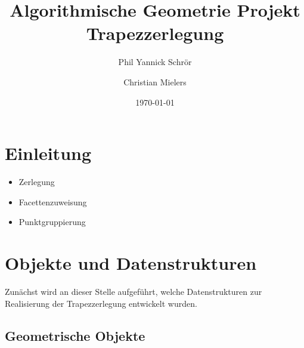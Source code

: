 \documentclass[11pt, a4paper]{article}
\title{Algorithmische Geometrie Projekt \\ Trapezzerlegung}
\author{Phil Yannick Schrör \and Christian Mielers}
\date{\today}
\begin{document}
\maketitle

\section{Einleitung}

\begin{itemize}
\item Zerlegung
\item Facettenzuweisung
\item Punktgruppierung
\end{itemize}

\section{Objekte und Datenstrukturen}

Zunächst wird an dieser Stelle aufgeführt, welche Datenstrukturen zur Realisierung der Trapezzerlegung entwickelt wurden.

\subsection{Geometrische Objekte}
\end{document}
